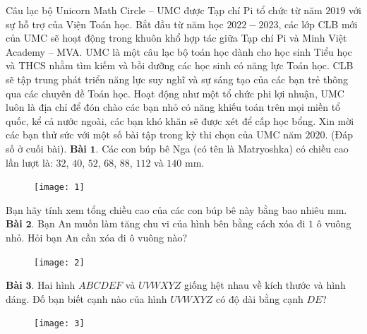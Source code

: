 \begin{multicols}{2}
	Câu lạc bộ Unicorn Math Circle -- UMC được Tạp chí Pi tổ chức từ năm $2019$ với sự hỗ trợ của Viện Toán học. Bắt đầu từ năm học $2022-2023$, các lớp CLB mới của UMC sẽ hoạt động trong khuôn khổ hợp tác giữa Tạp chí Pi và Minh Việt Academy -- MVA.
	\vskip 0.1cm
	UMC là một câu lạc bộ toán học dành cho học sinh Tiểu học và THCS nhằm tìm kiếm và bồi dưỡng các học sinh có năng lực Toán học. CLB sẽ tập trung phát triển năng lực suy nghĩ và sự sáng tạo của các bạn trẻ thông qua các chuyên đề Toán học.
	\vskip 0.1cm
	Hoạt động như một tổ chức phi lợi nhuận, UMC luôn là địa chỉ để đón chào các bạn nhỏ có năng khiếu toán trên mọi miền tổ quốc, kể cả nước ngoài, các bạn khó khăn sẽ được xét để cấp học bổng. Xin mời các bạn thử sức với một số bài tập trong kỳ thi chọn của UMC năm $2020$. (Đáp số ở cuối bài). 
	\vskip 0.1cm
	\textbf{Bài} $\pmb{1.}$ Các con búp bê Nga (có tên là Matryoshka) có chiều cao lần lượt là: $32$, $40$, $52$, $68$, $88$, $112$ và $140$ mm.
	\begin{figure}[H]
		\centering
		\vspace*{-5pt}
		\captionsetup{labelformat= empty, justification=centering}
		\texttt{[image: 1]}
		\vspace*{-10pt}
	\end{figure}
	Bạn hãy tính xem tổng chiều cao của các con búp bê này bằng bao nhiêu mm.
	\vskip 0.1cm
	\textbf{Bài} $\pmb{2.}$ Bạn An muốn làm tăng chu vi của hình bên bằng cách xóa đi $1$ ô vuông nhỏ. Hỏi bạn An cần xóa đi ô vuông nào?
	\begin{figure}[H]
		\centering
		\vspace*{-5pt}
		\captionsetup{labelformat= empty, justification=centering}
		\texttt{[image: 2]}
		\vspace*{-10pt}
	\end{figure}

	\textbf{Bài} $\pmb{3.}$ Hai hình $ABCDEF$ và $UVWXYZ$ giống hệt nhau về kích thước và hình dáng. Đố bạn biết cạnh nào của hình $UVWXYZ$ có độ dài bằng cạnh $DE$?
	\begin{figure}[H]
		\centering
		\vspace*{-5pt}
		\captionsetup{labelformat= empty, justification=centering}
		\texttt{[image: 3]}
		\vspace*{-10pt}
	\end{figure}


\end{multicols}

